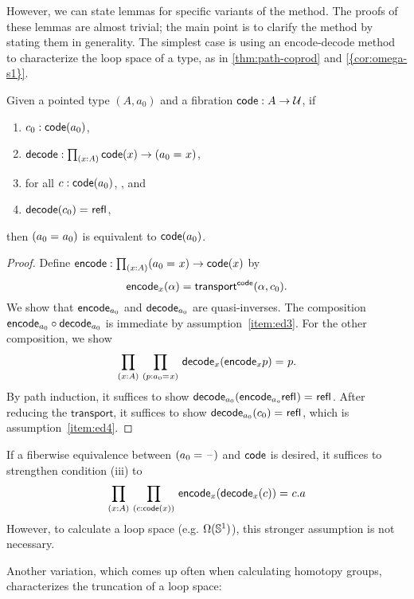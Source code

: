 However, we can state lemmas for specific variants of the method.
The proofs of these lemmas are almost trivial; the main point is to
clarify the method by stating them in generality.  The simplest
case is using an encode-decode method to characterize the loop space of a
type, as in \cref{thm:path-coprod} and \cref{{cor:omega-s1}}.

\begin{lem}
Given a pointed type $(A,a_0)$ and a fibration
$\mathsf{code} : A \to \mathcal{U}$, if
\begin{enumerate}
\item $c_0 : \mathsf{code}(a_0)$,\label{item:ed1}
\item $\decode : \prd{x:A} \code(x) \to (\id{a_0}{x})$,\label{item:ed2}
\item for all $c : \mathsf{code}(a_0)$, , and\label{item:ed3}
\item $\mathsf{decode}(c_0) =_{} \mathsf{refl}_{}$,\label{item:ed4}
\end{enumerate}
then $(a_0 =_{} a_0)$ is equivalent to $\mathsf{code}(a_0)$.
\end{lem}

\begin{proof}
Define
$\encode : \prd{x:A} (\id{a_0}{x}) \to \code(x)$ by
\[
\mathsf{encode}_x(\alpha) = \mathsf{transport}^{\mathsf{code}}(\alpha,c_0).
\]
We show that $\mathsf{encode}_{a_0}$ and $\mathsf{decode}_{a_0}$ are quasi-inverses.
The composition $\mathsf{encode}_{a_0} \circ \mathsf{decode}_{a_0}$ is immediate by
assumption~\ref{item:ed3}.  For the other composition, we show
\[
\prd{x:A}{p : \id{a_0}{x}} \id{\decode_{x} (\encode_{x} p)}{p}.
\]
By path induction, it suffices to show
${\mathsf{decode}_{{a_0}} (\mathsf{encode}_{{a_o}} \mathsf{refl}_{})} =_{} \mathsf{refl}_{}$.
After reducing the $\mathsf{transport}$, it suffices to show
${\mathsf{decode}_{{a_0}} (c_0)} =_{} \mathsf{refl}_{}$, which is assumption~\ref{item:ed4}.
\end{proof}

If a fiberwise equivalence between $(a_0 =_{} \mathord{\hspace{1pt}\text{--}\hspace{1pt}})$ and $\mathsf{code}$ is desired,
it suffices to strengthen condition (iii) to
\[
\prd{x:A}{c : \code(x)} \id{\encode_{x}(\decode_{x}(c))}{c}.a
\]
However, to calculate a loop space (e.g. $\Omega(\mathbb{S} ^1)$), this
stronger assumption is not necessary.

Another variation, which comes up often when calculating homotopy
groups, characterizes the truncation of a loop space:

